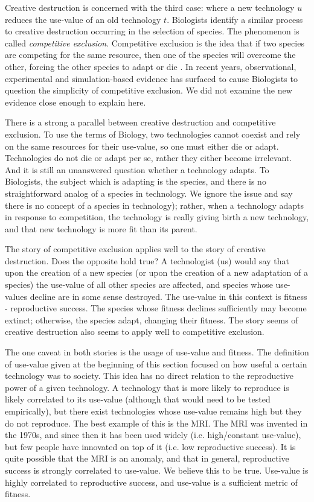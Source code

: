 \documentclass[11pt]{article}
\begin{document}
Creative destruction is concerned with the third case: where a new technology $u$ reduces the use-value of an old technology $t$. 
Biologists identify a similar process to creative destruction occurring in the selection of species. 
The phenomenon is called \textit{competitive exclusion}. 
Competitive exclusion is the idea that if two species are competing for the same resource, then one of the species will overcome the other, forcing the other species to adapt or die \cite{wiki}. 
In recent years, observational, experimental and simulation-based evidence has surfaced to cause Biologists to question the simplicity of competitive exclusion.
We did not examine the new evidence close enough to explain here.

There is a strong a parallel between creative destruction and competitive exclusion.
To use the terms of Biology, two technologies cannot coexist and rely on the same resources for their use-value, so one must either die or adapt. 
Technologies do not die or adapt per se, rather they either become irrelevant.
And it is still an unanswered question whether a technology adapts. 
To Biologists, the subject which is adapting is the species, and there is no straightforward analog of a species in technology. 
We ignore the issue and say there is no concept of a species in technology); rather, when a technology adapts in response to competition, the technology is really giving birth a new technology, and that new technology is more fit than its parent.

The story of competitive exclusion applies well to the story of creative destruction.
Does the opposite hold true?
A technologist (us) would say that upon the creation of a new species (or upon the creation of a new adaptation of a species) the use-value of all other species are affected, and species whose use-values decline are in some sense destroyed. 
The use-value in this context is fitness - reproductive success.
The species whose fitness declines sufficiently may become extinct; otherwise, the species adapt, changing their fitness. 
The story seems of creative destruction also seems to apply well to competitive exclusion.

The one caveat in both stories is the usage of use-value and fitness. 
The definition of use-value given at the beginning of this section focused on how useful a certain technology was to society. 
This idea has no direct relation to the reproductive power of a given technology. 
A technology that is more likely to reproduce is likely correlated to its use-value (although that would need to be tested empirically), but there exist technologies whose use-value remains high but they do not reproduce. 
The best example of this is the MRI.
The MRI was invented in the 1970s, and since then it has been used widely (i.e. high/constant use-value), but few people have innovated on top of it (i.e. low reproductive success). 
It is quite possible that the MRI is an anomaly, and that in general, reproductive success is strongly correlated to use-value. 
We believe this to be true.
Use-value is highly correlated to reproductive success, and use-value is a sufficient metric of fitness.
\end{document}
